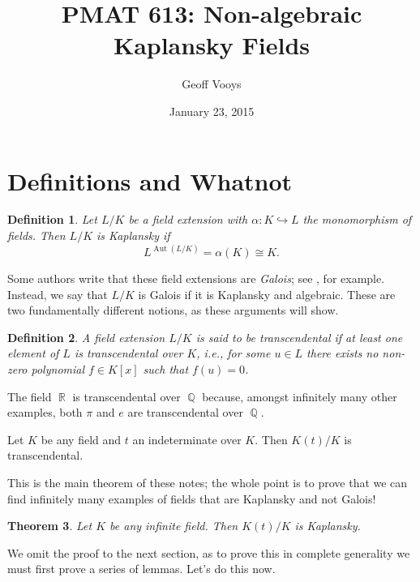 \documentclass[10pt]{article}
\title{PMAT 613: Non-algebraic Kaplansky Fields}
\author{Geoff Vooys}
\date{January 23, 2015}
\newtheorem{Theorem}{Theorem}
\newtheorem{Definition}[Theorem]{Definition}
\DeclareMathOperator{\Q}{\mathbb{Q}}
\DeclareMathOperator{\R}{\mathbb{R}}
\DeclareMathOperator{\aut}{Aut}
\DeclareMathOperator{\aut}{rank}
\numberwithin{Theorem}{section}
\begin{document}
\maketitle

\section{Definitions and Whatnot}

\begin{Definition}
Let $L/K$ be a field extension with $\alpha: K \hookrightarrow L$ the monomorphism of fields. Then $L/K$ is Kaplansky if
\[
 L^{\aut(L/K)} = \alpha(K) \cong K. 
\]
\end{Definition}
Some authors write that these field extensions are \emph{Galois}; see \cite{Hungerford}, for example. Instead, we say that $L/K$ is Galois if it is Kaplansky and algebraic. These are two fundamentally different notions, as these arguments will show.
\begin{Definition}
A field extension $L/K$ is said to be transcendental if at least one element of $L$ is transcendental over $K$, i.e., for some $u \in L$ there exists no non-zero polynomial $f \in K[x]$ such that $f(u) = 0$.
\end{Definition} 
\begin{example}
The field $\R$ is transcendental over $\Q$ because, amongst infinitely many other examples, both $\pi$ and $e$ are transcendental over $\Q$.
\end{example}
\begin{example}
Let $K$ be any field and $t$ an indeterminate over $K$. Then $K(t)/K$ is transcendental.
\end{example}
\indent This is the main theorem of these notes; the whole point is to prove that we can find infinitely many examples of fields that are Kaplansky and not Galois!
\begin{Theorem}
Let $K$ be any infinite field. Then $K(t)/K$ is Kaplansky.
\end{Theorem}
We omit the proof to the next section, as to prove this in complete generality we must first prove a series of lemmas. Let's do this now.
\end{document}
